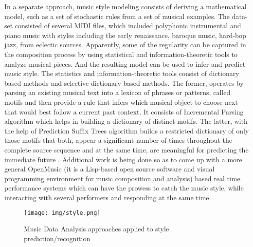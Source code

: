 \documentclass{proc}
\begin{document}
In a separate approach, music style modeling consists of deriving a mathematical model, such as a set of stochastic rules from a set of musical examples. The data-set consisted of several MIDI files, which included polyphonic instrumental and piano music with styles including the early renaissance, baroque music, hard-bop jazz, from eclectic sources. Apparently, some of the regularity can be captured in the composition process by using statistical and information-theoretic tools to analyze musical pieces. And the resulting model can be used to infer and predict music style. The statistics and information-theoretic tools consist of dictionary based methods and selective dictionary based methods. The former, operates by parsing an existing musical text into a lexicon of phrases or patterns, called motifs and then provide a rule that infers which musical object to choose next that would best follow a current past context. It consists of Incremental Parsing algorithm which helps in building a dictionary of distinct motifs. The latter, with the help of Prediction Suffix Trees algorithm builds a restricted dictionary of only those motifs that both, appear a significant number of times throughout the complete source sequence and at the same time, are meaningful for predicting the immediate future \cite{Dubnov2003}. Additional work is being done so as to come up with a more general OpenMusic (it is a Lisp-based open source software and visual programming environment for music composition and analysis) based real time performance systems which can have the prowess to catch the music style, while interacting with several performers and responding at the same time.  \par
\begin{figure}[htbp]
	\centering
		\texttt{[image: img/style.png]}
	\caption{Music Data Analysis approaches applied to style prediction/recognition }
	\label{fig:style}
\end{figure}
\end{document}
